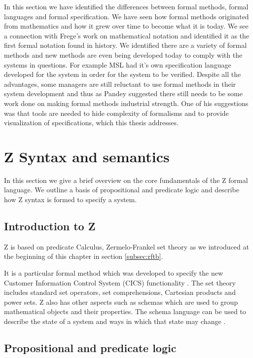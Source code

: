 In this section we have identified the differences between formal methods, formal languages and formal specification. We have seen how formal methods originated from mathematics and how it grew over time to become what it is today. We see a connection with Frege's work on mathematical notation and identified it as the first formal notation found in history. We identified there are a variety of formal methods and new methods are even being developed today to comply with the systems in questions. For example MSL had it's own specification language developed for the system in order for the system to be verified. Despite all the advantages, some managers are still reluctant to use formal methods in their system development and thus as Pandey suggested there still needs to be some work done on making formal methods industrial strength. One of his suggestions was that tools are needed to hide complexity of formalisms and to provide visualization of specifications, which this thesis addresses.

\section{Z Syntax and semantics}
\label{sec:theznotation}

In this section we give a brief overview on the core fundamentals of the Z formal language. We outline a basis of propositional and predicate logic and describe how Z syntax is formed to specify a system.

\subsection{Introduction to Z}


Z is based on predicate Calculus, Zermelo-Frankel set theory as we introduced at the beginning of this chapter in section \ref{subsec:rftb}.

It is a particular formal method which was developed to specify the new Customer Information Control System (CICS) functionality \cite{cics}. The set theory includes standard set operators, set comprehensions, Cartesian products and power sets. Z also has other aspects such as schemas which are used to group mathematical objects and their properties. The schema language can be used to describe the state of a system and ways in which that state may change \cite{Woodcock:1996:UZS:235337}.

\subsection{Propositional and predicate logic}

